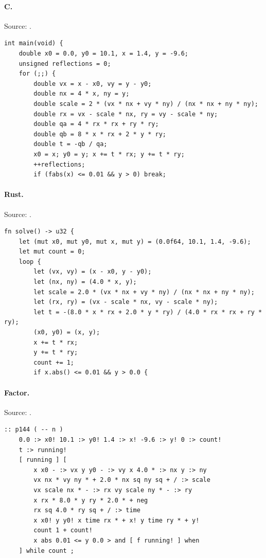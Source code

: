 \paragraph{C.} Source: .
\begin{lstlisting}
int main(void) {
    double x0 = 0.0, y0 = 10.1, x = 1.4, y = -9.6;
    unsigned reflections = 0;
    for (;;) {
        double vx = x - x0, vy = y - y0;
        double nx = 4 * x, ny = y;
        double scale = 2 * (vx * nx + vy * ny) / (nx * nx + ny * ny);
        double rx = vx - scale * nx, ry = vy - scale * ny;
        double qa = 4 * rx * rx + ry * ry;
        double qb = 8 * x * rx + 2 * y * ry;
        double t = -qb / qa;
        x0 = x; y0 = y; x += t * rx; y += t * ry;
        ++reflections;
        if (fabs(x) <= 0.01 && y > 0) break;
\end{lstlisting}

\paragraph{Rust.} Source: .
\begin{lstlisting}
fn solve() -> u32 {
    let (mut x0, mut y0, mut x, mut y) = (0.0f64, 10.1, 1.4, -9.6);
    let mut count = 0;
    loop {
        let (vx, vy) = (x - x0, y - y0);
        let (nx, ny) = (4.0 * x, y);
        let scale = 2.0 * (vx * nx + vy * ny) / (nx * nx + ny * ny);
        let (rx, ry) = (vx - scale * nx, vy - scale * ny);
        let t = -(8.0 * x * rx + 2.0 * y * ry) / (4.0 * rx * rx + ry * ry);
        (x0, y0) = (x, y);
        x += t * rx;
        y += t * ry;
        count += 1;
        if x.abs() <= 0.01 && y > 0.0 {
\end{lstlisting}

\paragraph{Factor.} Source: .
\begin{lstlisting}
:: p144 ( -- n )
    0.0 :> x0! 10.1 :> y0! 1.4 :> x! -9.6 :> y! 0 :> count!
    t :> running!
    [ running ] [
        x x0 - :> vx y y0 - :> vy x 4.0 * :> nx y :> ny
        vx nx * vy ny * + 2.0 * nx sq ny sq + / :> scale
        vx scale nx * - :> rx vy scale ny * - :> ry
        x rx * 8.0 * y ry * 2.0 * + neg
        rx sq 4.0 * ry sq + / :> time
        x x0! y y0! x time rx * + x! y time ry * + y!
        count 1 + count!
        x abs 0.01 <= y 0.0 > and [ f running! ] when
    ] while count ;
\end{lstlisting}

